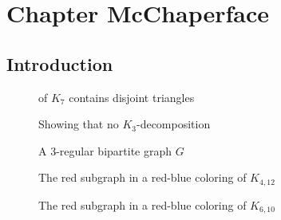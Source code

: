 

 
\setcounter{chapter}{2}  %


 \chapter{Chapter McChaperface}                          \label{ch3}  %

\doublespacing

 \section{Introduction}



   
\begin{figure}[ht]\centering

\caption{Showing that no $K_3$-decomposition}  \label{sram9}

{of $K_7$ contains disjoint triangles} 
\end{figure}


 \begin{figure}[ht]\centering

\caption{A 3-regular bipartite  graph $G$} \label{sram8}
\end{figure}

\begin{figure}[ht]\centering

\caption{The red subgraph in a red-blue coloring  of $K_{4, 12}$}   \label{sram13}
\end{figure}



\begin{figure}[ht]\centering

\caption{The red subgraph in a red-blue coloring  of $K_{6, 10}$}   \label{sram16}
\end{figure}




